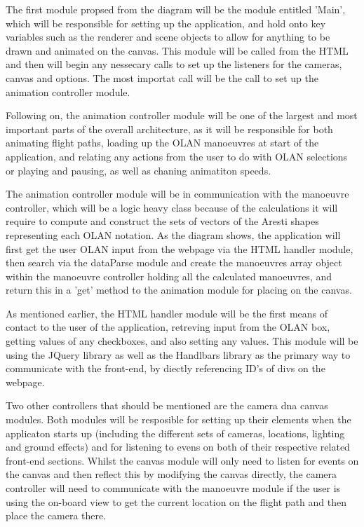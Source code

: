 The first module propsed from the diagram will be the module entitled 'Main', which will be responsible for setting up the application, and hold onto key variables such as the renderer and scene objects to allow for anything to be drawn and animated on the canvas. This module will be called from the HTML and then will begin any nessecary calls to set up the listeners for the cameras, canvas and options. The most importat call will be the call to set up the animation controller module. 

Following on, the animation controller module will be one of the largest and most important parts of the overall architecture, as it will be responsible for both animating flight paths, loading up the OLAN manoeuvres at start of the application, and relating any actions from the user to do with OLAN selections or playing and pausing, as well as chaning animatiton speeds. 

The animation controller module will be in communication with the manoeuvre controller, which will be a logic heavy class because of the calculations it will require to compute and construct the sets of vectors of the Aresti shapes representing each OLAN notation. As the diagram shows, the application will first get the user OLAN input from the webpage via the HTML handler module, then search via the dataParse module and create the manoeuvres array object within the manoeuvre controller holding all the calculated manoeuvres, and return this in a 'get' method to the animation module for placing on the canvas.

As mentioned earlier, the HTML handler module will be the first means of contact to the user of the application, retreving input from the OLAN box, getting values of any checkboxes, and also setting any values. This module will be using the JQuery library as well as the Handlbars library as the primary way to communicate with the front-end, by diectly referencing ID's of divs on the webpage.

Two other controllers that should be mentioned are the camera dna canvas modules. Both modules will be resposible for setting up their elements when the applicaton starts up (including the different sets of cameras, locations, lighting and ground effects) and for listening to evens on both of their respective related front-end sections. Whilst the canvas module will only need to listen for events on the canvas and then reflect this by modifying the canvas directly, the camera controller will need to communicate with the manoeuvre module if the user is using the on-board view to get the current location on the flight path and then place the camera there. 

